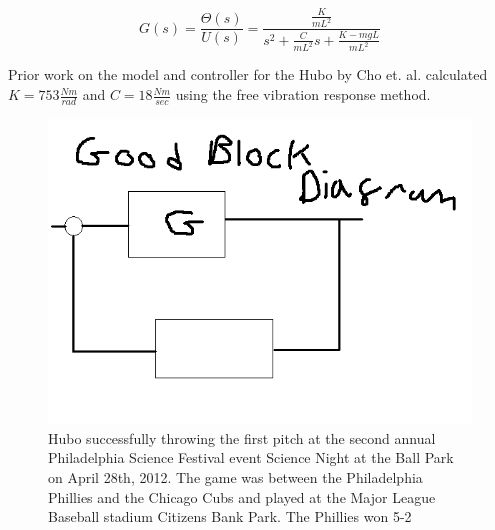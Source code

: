 \begin{equation}
G(s) = \frac{\Theta(s)}{U(s)} = \frac{\frac{K}{mL^2}}{s^2+\frac{C}{mL^2}s + \frac{K-mgL}{mL^2}}
\end{equation}

Prior work on the model and controller for the Hubo by Cho et. al. calculated $K=753\frac{Nm}{rad}$ and $C=18\frac{Nm}{sec}$ using the free vibration response method\cite{5379574}.



\begin{figure}[t]
  \centering
\includegraphics[width=1.0\columnwidth]{./pix/blockDiagram.png}
  \caption{Hubo successfully throwing the first pitch at the second annual Philadelphia Science Festival event Science Night at the Ball Park on April 28th, 2012.  The game was between the Philadelphia Phillies and the Chicago Cubs and played at the Major League Baseball stadium Citizens Bank Park.  The Phillies won 5-2}
  \label{fig:invPen}
\end{figure}